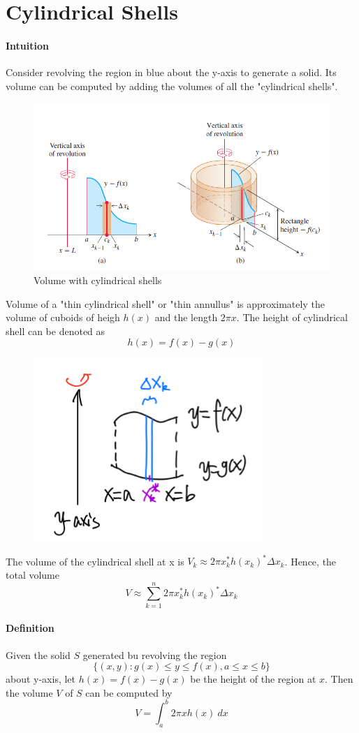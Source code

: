 \documentclass[12pt]{article}
\begin{document}
\section{Cylindrical Shells}
\paragraph{Intuition}
Consider revolving the region in blue about the y-axis to generate a solid. Its volume can be computed by adding the volumes of 
all the "cylindrical shells".
\begin{figure}[H]
     \centering
     \includegraphics[width = 0.6\linewidth]{Images/cylindrical shell.png}
     \caption{Volume with cylindrical shells}
\end{figure}
Volume of a "thin cylindrical shell" or "thin annullus" is approximately the volume of cuboids of heigh $h(x)$ and the length $2\pi x$.
The height of cylindrical shell can be denoted as 
\[
    h(x) = f(x) - g(x)
\]
\begin{figure}[H]
     \centering
     \includegraphics[width = 0.4\linewidth]{Images/cylindrical shell 2.png}
\end{figure}
The volume of the cylindrical shell at x is $V_k \approx 2\pi x_k^{*} h(x_k)^* \Delta x_k$.
Hence, the total volume 
\[
    V \approx \sum_{k = 1}^n 2\pi x_k^* h(x_k)^* \Delta x_k
\]

\paragraph{Definition}
Given the solid $S$ generated bu revolving the region
\[
    \{(x, y) : g(x) \leq y \leq f(x), a \leq x \leq b \}
\]
about y-axis, let $h(x) = f(x) - g(x)$ be the height of the region at $x$. Then 
the volume $V$ of $S$ can be computed by
\[
    V = \int_a^b 2 \pi x h(x)\: dx
\]
\end{document}

